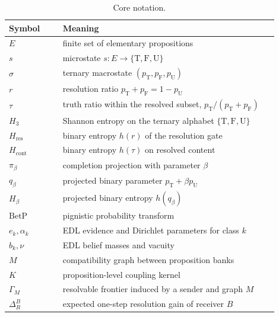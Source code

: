 \documentclass[11pt]{article}
\newcommand{\T}{\mathrm{T}}
\newcommand{\F}{\mathrm{F}}
\newcommand{\U}{\mathrm{U}}
\newcommand{\BetP}{\mathrm{BetP}}
\newcommand{\1}{\mathbf{1}}
\newcommand{\hbin}{h}
\begin{document}
\begin{table}[h]
\centering
\caption{Core notation.}
\begin{tabular}{>{\raggedright\arraybackslash}p{0.18\linewidth}p{0.72\linewidth}}
\toprule
Symbol & Meaning \\
\midrule
$E$ & finite set of elementary propositions \\
$s$ & microstate $s:E\to\{\T,\F,\U\}$ \\
$\sigma$ & ternary macrostate $(p_\T,p_\F,p_\U)$ \\
$r$ & resolution ratio $p_\T+p_\F=1-p_\U$ \\
$\tau$ & truth ratio within the resolved subset, $p_\T/(p_\T+p_\F)$ \\
$H_3$ & Shannon entropy on the ternary alphabet $\{\T,\F,\U\}$ \\
$H_{\mathrm{res}}$ & binary entropy $\hbin(r)$ of the resolution gate \\
$H_{\mathrm{cont}}$ & binary entropy $\hbin(\tau)$ on resolved content \\
$\pi_\beta$ & completion projection with parameter $\beta$ \\
$q_\beta$ & projected binary parameter $p_\T+\beta p_\U$ \\
$H_\beta$ & projected binary entropy $\hbin(q_\beta)$ \\
$\BetP$ & pignistic probability transform \\
$e_k,\alpha_k$ & EDL evidence and Dirichlet parameters for class $k$ \\
$b_k,\nu$ & EDL belief masses and vacuity \\
$M$ & compatibility graph between proposition banks \\
$K$ & proposition-level coupling kernel \\
$\Gamma_M$ & resolvable frontier induced by a sender and graph $M$ \\
$\Delta_R^B$ & expected one-step resolution gain of receiver $B$ \\
\bottomrule
\end{tabular}
\end{table}
\end{document}
